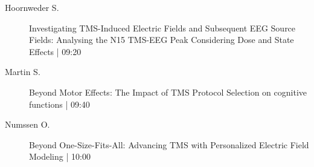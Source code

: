 \begin{symposium}
\begin{description}
                \item [ Hoornweder S.] Investigating TMS-Induced Electric Fields and Subsequent EEG Source Fields: Analysing the N15 TMS-EEG Peak Considering Dose and State Effects \textcolor{mygray}{ | 09:20}    
                
                \item [ Martin S.] Beyond Motor Effects: The Impact of TMS Protocol Selection on cognitive functions \textcolor{mygray}{ | 09:40}    
                
                \item [ Numssen O.] Beyond One-Size-Fits-All: Advancing TMS with Personalized Electric Field Modeling \textcolor{mygray}{ | 10:00}    
                
            \end{description} 
            \end{symposium}
            